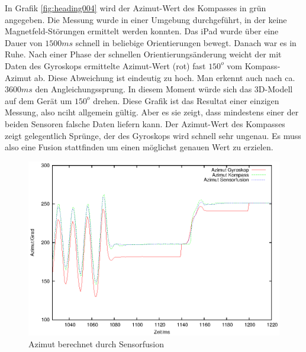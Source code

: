 In Grafik \ref{fig:heading004} wird der Azimut-Wert des Kompasses in grün angegeben. Die Messung wurde in einer Umgebung durchgeführt, in der keine Magnetfeld-Störungen ermittelt werden konnten. Das iPad wurde über eine Dauer von $1500ms$ schnell in beliebige Orientierungen bewegt. Danach war es in Ruhe. Nach einer Phase der schnellen Orientierungsänderung weicht der mit Daten des Gyroskops ermittelte Azimut-Wert (rot) fast $150^o$ vom Kompass-Azimut ab. Diese Abweichung ist eindeutig zu hoch. Man erkennt auch nach ca. $3600ms$ den Angleichungssprung. In diesem Moment würde sich das 3D-Modell auf dem Gerät um $150^o$ drehen. Diese Grafik ist das Resultat einer einzigen Messung, also nciht allgemein gültig. Aber es sie zeigt, dass mindestens einer der beiden Sensoren falsche Daten liefern kann. Der Azimut-Wert des Kompasses zeigt gelegentlich Sprünge, der des Gyroskops wird schnell sehr ungenau. Es muss also eine Fusion stattfinden um einen möglichst genauen Wert zu erzielen.

\begin{figure}[htb]
\centering
\includegraphics[scale=1]{figures/heading003}
\caption{Azimut berechnet durch Sensorfusion}
\label{fig:heading003}
\end{figure}

